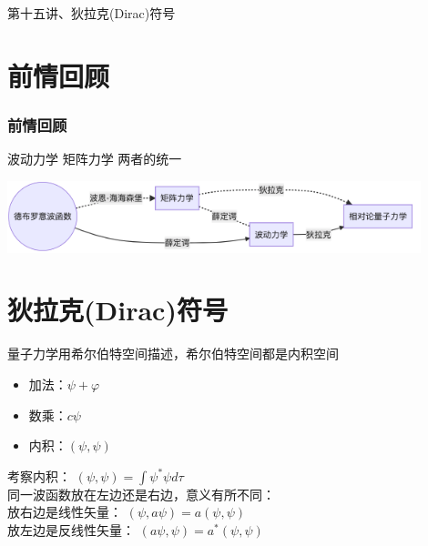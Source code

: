 \begin{frame}
    \frametitle{}
    \begin{center}
    { {\huge 第十五讲、狄拉克(Dirac)符号}}
    \end{center}    
\end{frame}

\section{前情回顾}

\begin{frame}
    \frametitle{前情回顾}
    \begin{itemize}
       \done 波动力学
       \done 矩阵力学
       \todo 两者的统一 
    \end{itemize}
        \begin{center}
            \includegraphics[width=0.9\textwidth]{figs/2021-12-06-16-22-39.png}\\   
        \end{center}    
\end{frame} 

\section{狄拉克(Dirac)符号}

\begin{frame}
    量子力学用希尔伯特空间描述，希尔伯特空间都是内积空间
    \begin{tcolorbox}[colback=yellow!5,colframe=red!75!black,title=希尔伯特空间]
    \begin{itemize}
        \item 加法：$\psi + \varphi$
        \item 数乘：$c\psi$
        \item 内积：$(\psi,\psi)$
    \end{itemize}
    \end{tcolorbox}
    考察内积： $(\psi,\psi)=\int\psi^*\psi d\tau$ \\
    同一波函数放在左边还是右边，意义有所不同： \\
    放右边是线性矢量：  $(\psi,a\psi)=a (\psi,\psi)$ \\
    放左边是反线性矢量：   $(a\psi,\psi)=a^* (\psi,\psi)$   
\end{frame}

